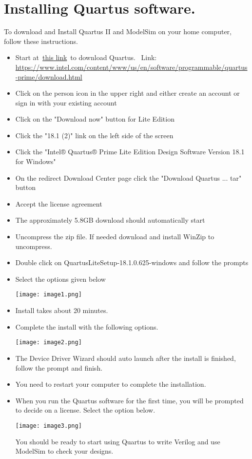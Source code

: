 \chapter{Installing Quartus software.}
\graphicspath{ {./Lab00HowTo/howTo00 Install Quartus/Fig} }



To download and Install Quartus II and ModelSim on your home computer,
follow these instructions.

\begin{itemize}
\item
  Start
  at~\href{https://www.intel.com/content/www/us/en/software/programmable/quartus-prime/download.html}{this
  link}~to download Quartus.~
Link:
\url{https://www.intel.com/content/www/us/en/software/programmable/quartus-prime/download.html}
\item
  Click on the person icon in the upper right and either create an
  account or sign in with your existing account
\item
  Click on the "Download now" button for Lite Edition
\item
  Click the "18.1 (2)" link on the left side of the screen
\item
  Click the "Intel® Quartus® Prime Lite Edition Design Software Version
  18.1 for Windows"
\item
  On the redirect Download Center page click the "Download Quartus ...
  tar" button
\item
  Accept the license agreement
\item
  The approximately 5.8GB download should automatically start
\item
  Uncompress the zip file. If needed download and install WinZip to
  uncompress.
\item
  Double click on QuartusLiteSetup-18.1.0.625-windows and follow the
  prompts
\item
  Select the options given below


\texttt{[image: image1.png]}

\item
  Install takes about 20 minutes.
\item
  Complete the install with the following options.


\texttt{[image: image2.png]}


\item
  The Device Driver Wizard should auto launch after the install is
  finished, follow the prompt and finish.
\item
  You need to restart your computer to complete the installation.
\item
  When you run the Quartus software for the first time, you will be
  prompted to decide on a license. Select the option below.

\texttt{[image: image3.png]}

You should be ready to start using Quartus to write Verilog and use
ModelSim to check your designs.
\end{itemize}
